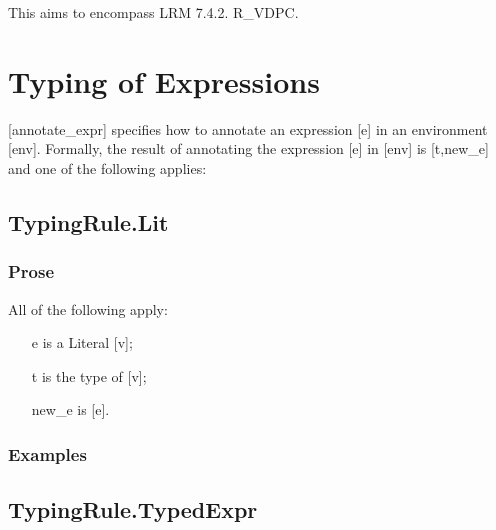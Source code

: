 \documentclass{book}
\begin{document}
This aims to encompass LRM 7.4.2. R\_VDPC.

\section{
Typing of Expressions
}

[annotate\_expr] specifies how to annotate an expression [e] in an environment
[env].  Formally, the result of annotating the expression [e] in [env] is
[t,new\_e] and one of the following applies:

\subsection{TypingRule.Lit}

  \subsubsection{Prose}
  All of the following apply:
  \begin{itemize}
  \item  [e] is a Literal [v];
  \item  [t] is the type of [v];
  \item  [new\_e] is [e].
  \end{itemize}
 
  \subsubsection{Examples}

\subsection{TypingRule.TypedExpr}
\end{document}
